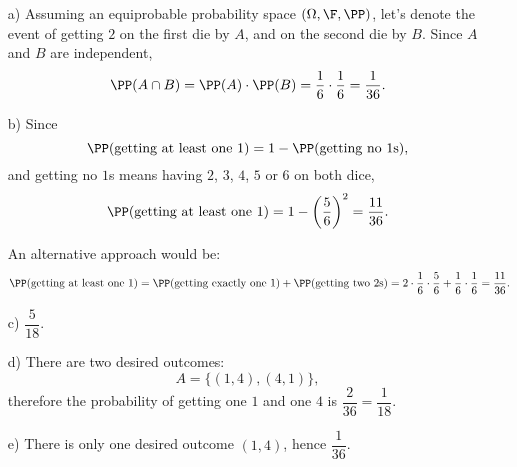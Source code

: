 \begin{solution}
\begin{enumerate}
    \item[a)] Assuming an equiprobable probability space $(\Omega,\F,\PP)$, let's denote the event of getting $2$ on the first die by $A$, and on the second die by $B$. Since $A$ and $B$ are independent,
\[
\PP(A \cap B) = \PP(A)\cdot\PP(B) = \dfrac{1}{6}\cdot\dfrac{1}{6} = \dfrac{1}{36}.
\]

    \item[b)] Since 
    \[
     \PP(\text{getting at least one }1) = 1 - \PP(\text{getting no }1\text{s}),
    \]
    and getting no $1$s means having $2$, $3$, $4$, $5$ or $6$ on both dice,
    \[
      \PP(\text{getting at least one }1) = 1 - \left(\dfrac{5}{6}\right)^2 = \dfrac{11}{36}.
    \]

    An alternative approach would be:
        \[
      \PP(\text{getting at least one }1) =\PP(\text{getting exactly one }1) + \PP(\text{getting two }2\text{s})  = 2\cdot\dfrac{1}{6}\cdot \dfrac{5}{6} + \dfrac{1}{6}\cdot \dfrac{1}{6} = \dfrac{11}{36}.
    \]

    
    \item[c)] $\dfrac{5}{18}$.


    \item[d)] There are two desired outcomes:
    \[
            A = \{(1, 4), (4,1)\},
    \]
    therefore the probability of getting one $1$ and one $4$ is $\dfrac{2}{36} = \dfrac{1}{18}$.
    

    \item[e)] There is only one desired outcome $(1,4)$, hence $\dfrac{1}{36}$.
    
\end{enumerate}



\end{solution}
\smallskip



